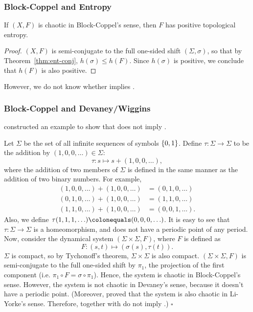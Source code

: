 \documentclass[10pt,twoside,draft]{book}
\begin{document}
\subsubsection*{Block-Coppel and Entropy}
\begin{theorem}
  If $(X,F)$ is chaotic in Block-Coppel's sense, then $F$ has positive topological entropy.
  \begin{proof}
    $(X,F)$ is semi-conjugate to the full one-sided shift $(\Sigma, \sigma)$, so that by Theorem~\ref{thm:ent-conj}, $h(\sigma) \leq h(F)$.
    Since $h(\sigma)$ is positive, we conclude that $h(F)$ is also positive.
  \end{proof}
  \label{thm:blcp-ent}
\end{theorem}
%
However, we do not know whether \akm implies \blcp.

\subsubsection*{Block-Coppel and Devaney/Wiggins}
\citet{aulbach} constructed an example to show that \blcp does not imply \dev.
\begin{example}
  \citep{aulbach} 
  Let $\Sigma$ be the set of all infinite sequences of symbols $\left \{ 0,1 \right \}$.
  Define $\tau: \Sigma \to \Sigma$ to be the addition by $(1, 0, 0, \ldots) \in \Sigma$:
  \begin{equation*}
    \tau: s \mapsto s + (1, 0, 0, \ldots),
  \end{equation*}
  where the addition of two members of $\Sigma$ is defined in the same manner as the addition of two binary numbers.
  For example, 
  \begin{align*}
    (1, 0, 0, \ldots) + (1, 0, 0, \ldots) &= (0, 1, 0, \ldots) \\
    (0, 1, 0, \ldots) + (1, 0, 0, \ldots) &= (1, 1, 0, \ldots) \\
    (1, 1, 0, \ldots) + (1, 0, 0, \ldots) &= (0, 0, 1, \ldots).
  \end{align*}
  Also, we define $\tau(1,1,1, \ldots) \ceq (0,0,0, \ldots)$.
  It is easy to see that $\tau: \Sigma \to \Sigma$ is a homeomorphism, and does not have a periodic point of any period.
  Now, consider the dynamical system $(\Sigma \times \Sigma, F)$, where $F$ is defined as
  \begin{equation*}
    F: (s, t) \mapsto (\sigma(s), \tau(t)).
  \end{equation*}
  $\Sigma$ is compact, so by Tychonoff's theorem, $\Sigma \times \Sigma$ is also compact.
  $(\Sigma \times \Sigma, F)$ is semi-conjugate to the full one-sided shift by $\pi_1$, the projection of the first component (i.e. $\pi_1 \circ F = \sigma \circ \pi_1$).
  Hence, the system is chaotic in Block-Coppel's sense.
  However, the system is not chaotic in Devaney's sense, because it doesn't have a periodic point.
  (Moreover, \citet{blockcoppel} proved that the system is also chaotic in Li-Yorke's sense.
  Therefore, \blcp together with \liy do not imply \dev.)
  $\square$
\end{example}
\end{document}
